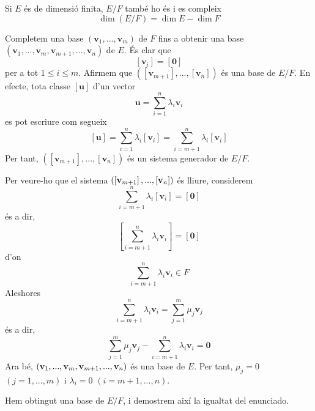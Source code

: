 \begin{teorema}
Si $E$ és de dimensió finita, $E/F$ també ho és i es compleix%
\begin{equation*}
\dim (E/F)=\dim E-\dim F
\end{equation*}

\end{teorema}
\begin{prova}
Completem una base $(\mathbf{v}_{1},...,\mathbf{v}_{m})$ de $F$
fins a obtenir una base $(\mathbf{v}_{1},...,\mathbf{v}_{m},\mathbf{v}%
_{m+1},...,\mathbf{v}_{n})$ de $E$. És clar que%
\begin{equation*}
\left[ \mathbf{v}_{i}\right] =\left[ \mathbf{0}\right]
\end{equation*}%
per a tot $1\leq i\leq m$. Afirmem que $(\left[ \mathbf{v}_{m+1}\right]
,...,\left[ \mathbf{v}_{n}\right] )$ és una base de $E/F$.
En efecte, tota classe $\left[ \mathbf{u}\right] $ d’un vector%
\begin{equation*}
\mathbf{u}=\sum_{i=1}^{n}\lambda _{i}\mathbf{v}_{i}
\end{equation*}%
es pot escriure com segueix%
\begin{equation*}
\left[ \mathbf{u}\right] =\sum_{i=1}^{n}\lambda _{i}\left[ \mathbf{v}_{i}%
\right] =\sum_{i=m+1}^{n}\lambda _{i}\left[ \mathbf{v}_{i}\right]
\end{equation*}%
Per tant, $(\left[ \mathbf{v}_{m+1}\right] ,...,\left[ \mathbf{v}_{n}\right]
)$ és un sistema generador de $E/F$.

Per veure-ho que el sistema $(\left[ \mathbf{v}_{m+1}\right] ,...,\left[ \mathbf{%
v}_{n}\right] )$ és lliure, considerem%
\begin{equation*}
\sum_{i=m+1}^{n}\lambda _{i}\left[ \mathbf{v}_{i}\right] =\left[ \mathbf{0}%
\right]
\end{equation*}%
és a dir,%
\begin{equation*}
\left[ \sum_{i=m+1}^{n}\lambda _{i}\mathbf{v}_{i}\right] =\left[ \mathbf{0}%
\right]
\end{equation*}%
d’on%
\begin{equation*}
\sum_{i=m+1}^{n}\lambda _{i}\mathbf{v}_{i}\in F
\end{equation*}%
Aleshores%
\begin{equation*}
\sum_{i=m+1}^{n}\lambda _{i}\mathbf{v}_{i}=\sum_{j=1}^{m}\mu _{j}\mathbf{v}%
_{j}
\end{equation*}%
és a dir,%
\begin{equation*}
\sum_{j=1}^{m}\mu _{j}\mathbf{v}_{j}-\sum_{i=m+1}^{n}\lambda _{i}\mathbf{v}%
_{i}=\mathbf{0}
\end{equation*}%
Ara bé, $(\mathbf{v}_{1},...,\mathbf{v}_{m},\mathbf{v}_{m+1},...,\mathbf{%
v}_{n})$ és una base de $E$. Per tant, $\mu _{j}=0$ $(j=1,...,m)$
i $\lambda _{i}=0$ $(i=m+1,...,n)$.

Hem obtingut una base de $E/F$, i demostrem així la
igualtat del enunciado.
\end{prova}

